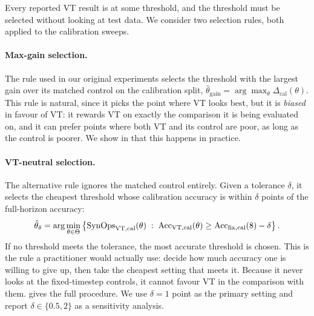 Every reported VT result is at some threshold, and the threshold must be selected without looking at test data. We consider two selection rules, both applied to the calibration sweeps.

\paragraph{Max-gain selection.} The rule used in our original experiments selects the threshold with the largest gain over its matched control on the calibration split, $\hat\theta_{\mathrm{gain}} = \arg\max_{\theta} \Delta_{\mathrm{cal}}(\theta)$. This rule is natural, since it picks the point where VT looks best, but it is \emph{biased} in favour of VT: it rewards VT on exactly the comparison it is being evaluated on, and it can prefer points where both VT and its control are poor, as long as the control is poorer. We show in  that this happens in practice.

\paragraph{VT-neutral selection.} The alternative rule ignores the matched control entirely. Given a tolerance $\delta$, it selects the cheapest threshold whose calibration accuracy is within $\delta$ points of the full-horizon accuracy:
\begin{equation}
    \hat\theta_{\delta} = \arg\min_{\theta \in \Theta} \left\{ \mathrm{SynOps}_{\mathrm{VT},\mathrm{cal}}(\theta) \;:\; \mathrm{Acc}_{\mathrm{VT},\mathrm{cal}}(\theta) \geq \mathrm{Acc}_{\mathrm{fix},\mathrm{cal}}(8) - \delta \right\}.
    \label{eq:neutral}
\end{equation}
If no threshold meets the tolerance, the most accurate threshold is chosen. This is the rule a practitioner would actually use: decide how much accuracy one is willing to give up, then take the cheapest setting that meets it. Because it never looks at the fixed-timestep controls, it cannot favour VT in the comparison with them.  gives the full procedure. We use $\delta = 1$ point as the primary setting and report $\delta \in \{0.5, 2\}$ as a sensitivity analysis.

